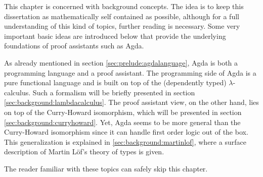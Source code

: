 This chapter is concerned with background concepts. The idea is to keep this dissertation as
mathematically self contained as possible, although for a full understanding of this kind of topics, further
reading is necessary. Some very important basic ideas are introduced below that provide the underlying foundations of proof assistants such as Agda.

As already mentioned in section \ref{sec:prelude:agdalanguage}, Agda is both a programming language and a proof assistant. The programming side of Agda is a pure functional language and is built on top of the (dependently typed) $\lambda$-calculus. Such a formalism will be briefly presented in section \ref{sec:background:lambdacalculus}. The proof assistant view, on the other hand, lies on top of the Curry-Howard isomorphism, which will be presented in section \ref{sec:background:curryhoward}. Yet, Agda seems to be
more general than the Curry-Howard isomorphism since it can handle first order logic out of the box. 
This generalization is explained in \ref{sec:background:martinlof}, where a surface description
of Martin L\"{o}f's theory of types is given.

The reader familiar with these topics can safely skip this chapter. 
